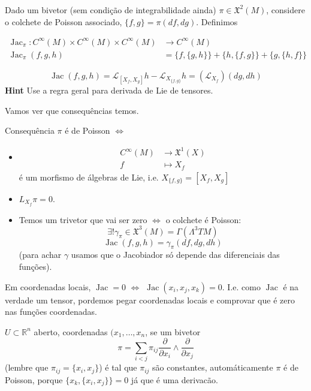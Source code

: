 Dado um bivetor (sem condição de integrabilidade ainda) \(\pi \in \mathfrak{X}^2(M)\), considere o colchete de Poisson associado,  \(\{f,g\}=\pi(df,dg)\). Definimos

\begin{align*}
	\operatorname{Jac}_\pi: C^\infty(M)\times C^\infty(M)\times C^\infty(M) &\longrightarrow C^\infty(M) \\
	\operatorname{Jac}_\pi(f,g,h) &=\{f,\{g,h\}\}+\{h,\{f,g\}\}+\{g,\{h,f\}\}
\end{align*}

\begin{exercise}\leavevmode
	\[\operatorname{Jac}(f,g,h)=\mathcal{L}_{[X_f,X_g]}h-\mathcal{L}_{X_{\{f,g\}}}h=(\mathcal{L}_{X_f})(dg,dh)\]
\textbf{Hint} Use a regra geral para derivada de Lie de tensores.
\end{exercise}

Vamos ver que consequências temos.

\begin{thing8}{Consequência}\leavevmode
\(\pi\) é de Poisson \(\iff\)
\begin{itemize}
\item 
	\begin{align*}
		C^\infty(M) &\longrightarrow \mathfrak{X}^1(X)\\
		f &\longmapsto X_f
	\end{align*}
	é um morfismo de álgebras de Lie, i.e. \(X_{\{f,g\}}=[X_f,X_g]\)

\item \(L_{X_f}\pi=0\).

\item Temos um trivetor que vai ser zero \(\iff\) o colchete é Poisson:
	\[\exists ! \gamma_\pi \in \mathfrak{X}^3(M)=\Gamma(\Lambda^{3}TM)\]
	\[\operatorname{Jac}(f,g,h)=\gamma_\pi(df,dg,dh)\]	
	(para achar \(\gamma\) usamos que o Jacobiador só depende das diferenciais das funções).	
\end{itemize}
\end{thing8}

\begin{remark}\leavevmode
Em coordenadas locais, \(\operatorname{Jac}=0\) \(\iff\) \(\operatorname{Jac}(x_i,x_j,x_k)=0\). I.e. como \(\operatorname{Jac}\) é na verdade um tensor, pordemos pegar coordenadas locais e comprovar que é zero nas funções coordenadas.
\end{remark}

\begin{example}\leavevmode
\(U \subset \mathbb{R}^n\) aberto, coordenadas \((x_1,\ldots,x_n\), se um bivetor
\[\pi= \sum_{i <  j}\pi_{ij}\frac{\partial }{\partial x_i}\wedge \frac{\partial }{\partial x_j}\]
(lembre que \(\pi_{ij}=\{x_i,x_j\}\)) é tal que \(\pi_{ij}\) são constantes, automáticamente \(\pi\) é de Poisson, porque \(\{x_k,\{x_i,x_j\}\}=0\) já que é uma derivacão.
\end{example}

